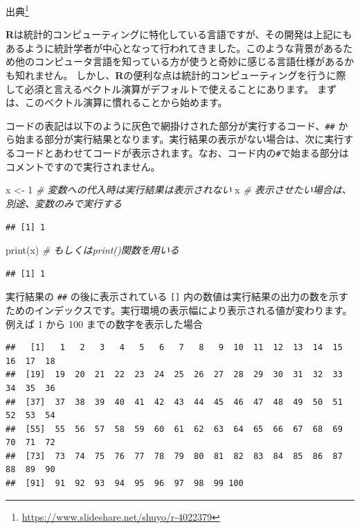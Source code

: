 \documentclass[
  12pt,
]{book}
\newenvironment{Shaded}{\begin{snugshade}}{\end{snugshade}}
\newcommand{\CommentTok}[1]{\textcolor[rgb]{0.56,0.35,0.01}{\textit{#1}}}
\newcommand{\DecValTok}[1]{\textcolor[rgb]{0.00,0.00,0.81}{#1}}
\newcommand{\FunctionTok}[1]{\textcolor[rgb]{0.00,0.00,0.00}{#1}}
\newcommand{\NormalTok}[1]{#1}
\newcommand{\OtherTok}[1]{\textcolor[rgb]{0.56,0.35,0.01}{#1}}
\DeclareRobustCommand{\href}[2]{#2\footnote{\url{#1}}}
\begin{document}
\href{https://www.slideshare.net/shuyo/r-4022379}{出典}

\textbf{R}は統計的コンピューティングに特化している言語ですが、その開発は上記にもあるように統計学者が中心となって行われてきました。このような背景があるため他のコンピュータ言語を知っている方が使うと奇妙に感じる言語仕様があるかも知れません。 しかし、\textbf{R}の便利な点は統計的コンピューティングを行うに際して必須と言えるベクトル演算がデフォルトで使えることにあります。 まずは、このベクトル演算に慣れることから始めます。

コードの表記は以下のように灰色で網掛けされた部分が実行するコード、\texttt{\#\#} から始まる部分が実行結果となります。実行結果の表示がない場合は、次に実行するコードとあわせてコードが表示されます。なお、コード内の\texttt{\#}で始まる部分はコメントですので実行されません。

\begin{Shaded}
\begin{Highlighting}[]
\NormalTok{x }\OtherTok{\textless{}{-}} \DecValTok{1}        \CommentTok{\# 変数への代入時は実行結果は表示されない}
\NormalTok{x             }\CommentTok{\# 表示させたい場合は、別途、変数のみで実行する}
\end{Highlighting}
\end{Shaded}

\begin{verbatim}
## [1] 1
\end{verbatim}

\begin{Shaded}
\begin{Highlighting}[]
\FunctionTok{print}\NormalTok{(x)      }\CommentTok{\# もしくはprint()関数を用いる}
\end{Highlighting}
\end{Shaded}

\begin{verbatim}
## [1] 1
\end{verbatim}

実行結果の \texttt{\#\#} の後に表示されている \texttt{{[}{]}} 内の数値は実行結果の出力の数を示すためのインデックスです。実行環境の表示幅により表示される値が変わります。例えば 1 から 100 までの数字を表示した場合

\begin{verbatim}
##   [1]   1   2   3   4   5   6   7   8   9  10  11  12  13  14  15  16  17  18
##  [19]  19  20  21  22  23  24  25  26  27  28  29  30  31  32  33  34  35  36
##  [37]  37  38  39  40  41  42  43  44  45  46  47  48  49  50  51  52  53  54
##  [55]  55  56  57  58  59  60  61  62  63  64  65  66  67  68  69  70  71  72
##  [73]  73  74  75  76  77  78  79  80  81  82  83  84  85  86  87  88  89  90
##  [91]  91  92  93  94  95  96  97  98  99 100
\end{verbatim}
\end{document}
